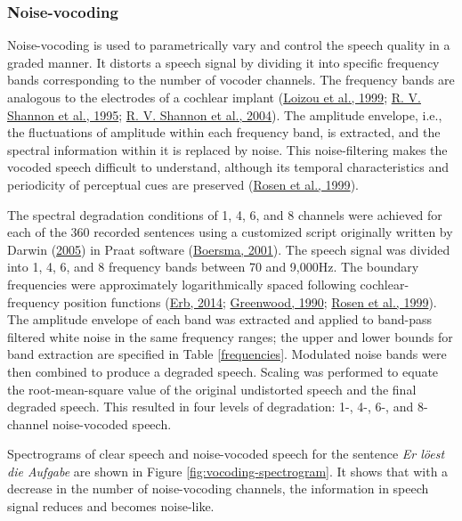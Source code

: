 \documentclass[a4paper, nobind]{templates/ociamthesis}
\begin{document}
\hypertarget{noise-vocoding}{%
\subsubsection{Noise-vocoding}\label{noise-vocoding}}

Noise-vocoding is used to parametrically vary and control the speech quality in a graded manner.
It distorts a speech signal by dividing it into specific frequency bands corresponding to the number of vocoder channels.
The frequency bands are analogous to the electrodes of a cochlear implant (\protect\hyperlink{ref-Loizou1999}{Loizou et al., 1999}; \protect\hyperlink{ref-Shannon1995}{R. V. Shannon et al., 1995}; \protect\hyperlink{ref-Shannon2004}{R. V. Shannon et al., 2004}).
The amplitude envelope, i.e., the fluctuations of amplitude within each frequency band, is extracted, and the spectral information within it is replaced by noise.
This noise-filtering makes the vocoded speech difficult to understand, although its temporal characteristics and periodicity of perceptual cues are preserved (\protect\hyperlink{ref-Rosen1999}{Rosen et al., 1999}).

The spectral degradation conditions of 1, 4, 6, and 8 channels were achieved for each of the 360 recorded sentences using a customized script originally written by Darwin (\protect\hyperlink{ref-Darwin2005}{2005}) in Praat software (\protect\hyperlink{ref-Praat2001}{Boersma, 2001}).
The speech signal was divided into 1, 4, 6, and 8 frequency bands between 70 and 9,000Hz.
The boundary frequencies were approximately logarithmically spaced following cochlear-frequency position functions (\protect\hyperlink{ref-Erb2014}{Erb, 2014}; \protect\hyperlink{ref-Greenwood1990}{Greenwood, 1990}; \protect\hyperlink{ref-Rosen1999}{Rosen et al., 1999}).
The amplitude envelope of each band was extracted and applied to band-pass filtered white noise in the same frequency ranges;
the upper and lower bounds for band extraction are specified in Table \ref{frequencies}.
Modulated noise bands were then combined to produce a degraded speech.
Scaling was performed to equate the root-mean-square value of the original undistorted speech and the final degraded speech.
This resulted in four levels of degradation: 1-, 4-, 6-, and 8-channel noise-vocoded speech.

Spectrograms of clear speech and noise-vocoded speech for the sentence \emph{Er löest die Aufgabe} are shown in Figure \ref{fig:vocoding-spectrogram}. It shows that with a decrease in the number of noise-vocoding channels, the information in speech signal reduces and becomes noise-like.
\end{document}
